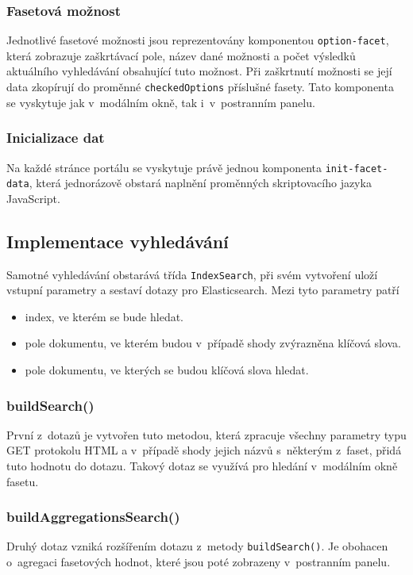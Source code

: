 \subsubsection*{Fasetová možnost}
Jednotlivé fasetové možnosti jsou reprezentovány komponentou \texttt{option-facet}, která zobrazuje zaškrtávací pole, název dané možnosti a počet výsledků aktuálního vyhledávání obsahující tuto možnost. Při zaškrtnutí možnosti se její data zkopírují do proměnné \texttt{checkedOptions} příslušné fasety. Tato komponenta se vyskytuje jak v~modálním okně, tak i~v~postranním panelu.

\subsubsection*{Inicializace dat}
Na každé stránce portálu se vyskytuje právě jednou komponenta \texttt{init-facet-data}, která jednorázově obstará naplnění proměnných skriptovacího jazyka JavaScript.

\subsection{Implementace vyhledávání}\label{section:search}
Samotné vyhledávání obstarává třída \texttt{IndexSearch}, při svém vytvoření uloží vstupní parametry a sestaví dotazy pro Elasticsearch. Mezi tyto parametry patří
\begin{itemize}
    \item index, ve kterém se bude hledat.
    \item pole dokumentu, ve kterém budou v~případě shody zvýrazněna klíčová slova.
    \item pole dokumentu, ve kterých se budou klíčová slova hledat.
\end{itemize}
\subsubsection*{buildSearch()}
První z~dotazů je vytvořen tuto metodou, která zpracuje všechny parametry typu GET protokolu HTML a v~případě shody jejich názvů s~některým z~faset, přidá tuto hodnotu do dotazu. Takový dotaz se využívá pro hledání v~modálním okně fasetu. 

\subsubsection*{buildAggregationsSearch()}
Druhý dotaz vzniká rozšířením dotazu z~metody \texttt{buildSearch()}. Je obohacen o~agregaci fasetových hodnot, které jsou poté zobrazeny v~postranním panelu.

